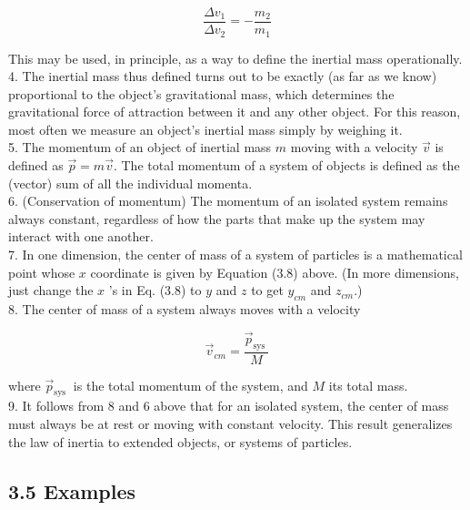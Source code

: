 \documentclass[10pt]{article}
\begin{document}
$$
\frac{\Delta v_{1}}{\Delta v_{2}}=-\frac{m_{2}}{m_{1}}
$$

This may be used, in principle, as a way to define the inertial mass operationally.\\
4. The inertial mass thus defined turns out to be exactly (as far as we know) proportional to the object's gravitational mass, which determines the gravitational force of attraction between it and any other object. For this reason, most often we measure an object's inertial mass simply by weighing it.\\
5. The momentum of an object of inertial mass $m$ moving with a velocity $\vec{v}$ is defined as $\vec{p}=m \vec{v}$. The total momentum of a system of objects is defined as the (vector) sum of all the individual momenta.\\
6. (Conservation of momentum) The momentum of an isolated system remains always constant, regardless of how the parts that make up the system may interact with one another.\\
7. In one dimension, the center of mass of a system of particles is a mathematical point whose $x$ coordinate is given by Equation (3.8) above. (In more dimensions, just change the $x$ 's in Eq. (3.8) to $y$ and $z$ to get $y_{c m}$ and $z_{c m}$.)\\
8. The center of mass of a system always moves with a velocity

$$
\vec{v}_{c m}=\frac{\vec{p}_{\text {sys }}}{M}
$$

where $\vec{p}_{\text {sys }}$ is the total momentum of the system, and $M$ its total mass.\\
9. It follows from 8 and 6 above that for an isolated system, the center of mass must always be at rest or moving with constant velocity. This result generalizes the law of inertia to extended objects, or systems of particles.

\subsection*{3.5 Examples}
\end{document}
